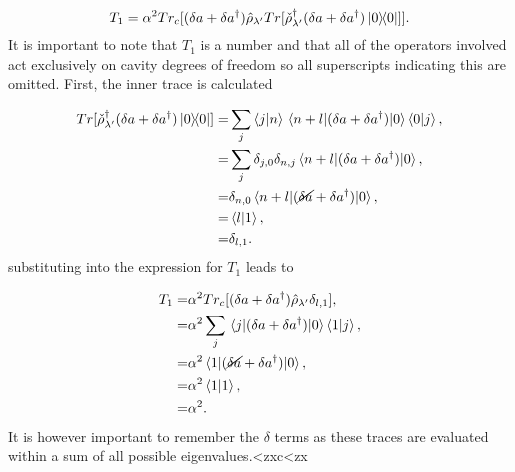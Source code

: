 \documentclass[12pt]{article}
\begin{document}
\begin{equation}
    T_1 = \alpha^2 Tr_c[(\delta a + \delta a^\dagger)\hat{\rho}_{\lambda'}Tr[\check{\rho}^\dagger_{\lambda'}(\delta a + \delta a^\dagger)\ketbra{0}{0}]].
\end{equation} It is important to note that $T_1$ is a number and that all of the operators involved act exclusively on cavity degrees of freedom so all superscripts indicating this are omitted. First, the inner trace is calculated

\begin{align}
    Tr[\check{\rho}^\dagger_{\lambda'}(\delta a + \delta a^\dagger)\ketbra{0}{0}] =& \sum_j \braket{j}{n}\mel{n+l}{(\delta a + \delta a^\dagger)}{0}\braket{0}{j},\\
    =&\sum_j \delta_{j,0}\delta_{n,j}\mel{n+l}{(\delta a + \delta a^\dagger)}{0} \nonumber,\\
    =&\delta_{n,0}\mel{n+l}{(\cancel{\delta a} + \delta a^\dagger)}{0}, \nonumber\\
    =& \braket{l}{1}, \nonumber\\
    =& \delta_{l,1}. \nonumber
\end{align}substituting into the expression for $T_1$ leads to

\begin{align}
    T_1 =& \alpha^2 Tr_c[(\delta a + \delta a^\dagger)\hat{\rho}_{\lambda'}\delta_{l,1}],\\
    =& \alpha^2\sum_j \mel{j}{(\delta a + \delta a^\dagger)}{0}\braket{1}{j}, \nonumber\\
    =& \alpha^2\mel{1}{(\cancel{\delta a} + \delta a^\dagger)}{0}, \nonumber \\
    =& \alpha^2\braket{1}{1}, \nonumber \\
    =& \alpha^2.
\end{align} It is however important to remember the $\delta$ terms as these traces are evaluated within a sum of all possible eigenvalues.<zxc<zx








\end{document}
